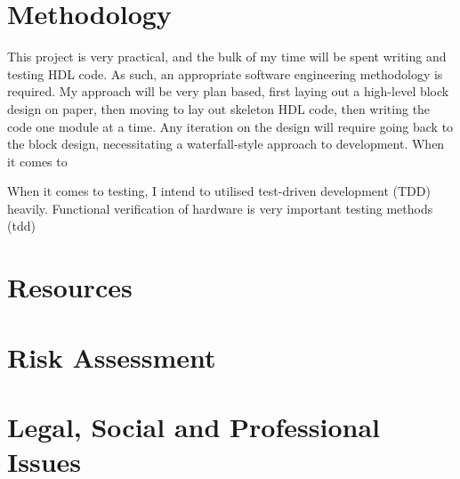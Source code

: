 \documentclass[a4paper,fleqn,12pt]{article}
\begin{document}
\section{Methodology}
This project is very practical, and the bulk of my time will be spent writing and testing HDL code. As such, an appropriate software engineering methodology is required. My approach will be very plan based, first laying out a high-level block design on paper, then moving to lay out skeleton HDL code, then writing the code one module at a time. Any iteration on the design will require going back to the block design, necessitating a waterfall-style approach to development. When it comes to

When it comes to testing, I intend to utilised test-driven development (TDD) heavily. Functional verification of hardware is very important
testing methods (tdd)
\section{Resources}
\section{Risk Assessment}
\section{Legal, Social and Professional Issues}


\end{document}

